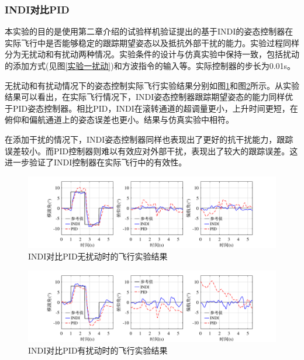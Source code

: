 \subsubsection{INDI对比PID}

本实验的目的是使用第二章介绍的试验样机验证提出的基于INDI的姿态控制器在实际飞行中是否能够稳定的跟踪期望姿态以及抵抗外部干扰的能力。实验过程同样分为无扰动和有扰动两种情况。实验条件的设计与仿真实验中保持一致，包括扰动的添加方式(见图\ref{实验一扰动})和方波指令的输入等。实际控制器的步长为0.01s。

无扰动和有扰动情况下的姿态控制实际飞行实验结果分别如图\ref{INDI对比PID无扰动飞行实验结果}和图\ref{INDI对比PID有扰动飞行实验结果}所示。从实验结果可以看出，在实际飞行情况下，INDI姿态控制器跟踪期望姿态的能力同样优于PID姿态控制器。相比PID，INDI在滚转通道的超调量更小，上升时间更短，在俯仰和偏航通道上的姿态误差也更小。结果与仿真实验中相符。

在添加干扰的情况下，INDI姿态控制器同样也表现出了更好的抗干扰能力，跟踪误差较小。而PID控制器则难以有效应对外部干扰，表现出了较大的跟踪误差。这进一步验证了INDI控制器在实际飞行中的有效性。
\begin{figure}[htbp]
	\centering
	\begin{minipage}[c]{1\textwidth}
        \centering
        \includegraphics[scale=1]{Fig/INDI对比PID无扰动飞行实验结果.pdf}
        \caption{\label{INDI对比PID无扰动飞行实验结果}INDI对比PID无扰动时的飞行实验结果}
        \end{minipage}
\end{figure}
\begin{figure}[htbp]
	\centering
	\begin{minipage}[c]{1\textwidth}
        \centering
        \includegraphics[scale=1]{Fig/INDI对比PID有扰动飞行实验结果.pdf}
        \caption{\label{INDI对比PID有扰动飞行实验结果}INDI对比PID有扰动时的飞行实验结果}
        \end{minipage}
\end{figure}

